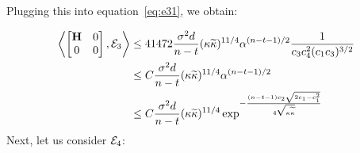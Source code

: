 Plugging this into equation~\ref{eq:e31}, we obtain:
\iffalse
\begin{align}
\label{eq:e3}
&\iprod{\begin{bmatrix}\H&0\\0&0\end{bmatrix}}{\Y_3}\leq41472\frac{\sigma^2d}{n-t}(\cnH\cnS)^{11/4}\alpha^{(n-t-1)/2}\frac{1}{\cthree\cfour^2(\cone\cthree)^{3/2}}
\end{align}
\fi
\begin{align}
\label{eq:e3}
\iprod{\begin{bmatrix}\H&0\\0&0\end{bmatrix}}{\Y_3}&\leq41472\frac{\sigma^2d}{n-t}(\cnH\cnS)^{11/4}\alpha^{(n-t-1)/2}\frac{1}{\cthree\cfour^2(\cone\cthree)^{3/2}}\nonumber\\
&\leq\UC\frac{\sigma^2d}{n-t}(\cnH\cnS)^{11/4}\alpha^{(n-t-1)/2}\nonumber\\%
&\leq\UC\frac{\sigma^2d}{n-t}(\cnH\cnS)^{11/4}\exp^{-\frac{(n-t-1)\ctwo\sqrt{2\cone-\cone^2}}{4\sqrt{\cnH\cnS}}}
\end{align}
Next, let us consider $\mathcal{E}_4$:
